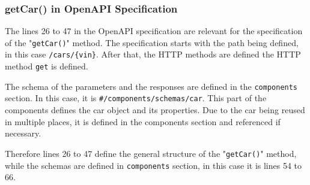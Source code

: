 \subsubsection*{getCar() in OpenAPI Specification}
The lines 26 to 47 in the OpenAPI specification are relevant for the specification of the "\texttt{getCar()}" method.
The specification starts with the path being defined, in this case \texttt{/cars/\{vin\}}.
After that, the HTTP methods are defined the HTTP method \texttt{get} is defined.

The schema of the parameters and the responses are defined in the \texttt{components} section.
In this case, it is \texttt{\#/components/schemas/car}.
This part of the components defines the car object and its properties.
Due to the car being reused in multiple places, it is defined in the components section and referenced if necessary.

Therefore lines 26 to 47 define the general structure of the "\texttt{getCar()}" method, while the schemas are defined in \texttt{components} section, in this case it is lines 54 to 66.